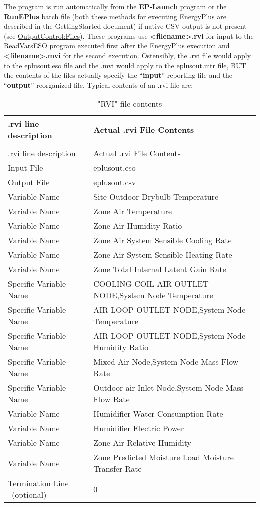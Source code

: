 The program is run automatically from the \textbf{EP-Launch} program or the \textbf{RunEPlus} batch file (both these methods for executing EnergyPlus are described in the GettingStarted document) if native CSV output is not present (see \hyperref[outputcontrolfiles]{OutputControl:Files}). These programs use \textbf{\textless{}filename\textgreater{}.rvi} for input to the ReadVarsESO program executed first after the EnergyPlus execution and \textbf{\textless{}filename\textgreater{}.mvi} for the second execution. Ostensibly, the .rvi file would apply to the eplusout.eso file and the .mvi would apply to the eplusout.mtr file, BUT the contents of the files actually specify the ``\textbf{input}'' reporting file and the ``\textbf{output}'' reorganized file. Typical contents of an .rvi file are:

\begin{longtable}[c]{p{2.1in}p{3.9in}}
\caption{"RVI" file contents \label{table:rvi-file-contents}} \tabularnewline
\toprule
.rvi line description & Actual .rvi File Contents \tabularnewline
\midrule
\endfirsthead

\caption[]{"RVI" file contents} \tabularnewline
\toprule
.rvi line description & Actual .rvi File Contents \tabularnewline
\midrule
\endhead

Input File & eplusout.eso \tabularnewline
Output File & eplusout.csv \tabularnewline
Variable Name & Site Outdoor Drybulb Temperature \tabularnewline
Variable Name & Zone Air Temperature \tabularnewline
Variable Name & Zone Air Humidity Ratio \tabularnewline
Variable Name & Zone Air System Sensible Cooling Rate \tabularnewline
Variable Name & Zone Air System Sensible Heating Rate \tabularnewline
Variable Name & Zone Total Internal Latent Gain Rate \tabularnewline
Specific Variable Name & COOLING COIL AIR OUTLET NODE,System Node Temperature \tabularnewline
Specific Variable Name & AIR LOOP OUTLET NODE,System Node Temperature \tabularnewline
Specific Variable Name & AIR LOOP OUTLET NODE,System Node Humidity Ratio \tabularnewline
Specific Variable Name & Mixed Air Node,System Node Mass Flow Rate \tabularnewline
Specific Variable Name & Outdoor air Inlet Node,System Node Mass Flow Rate \tabularnewline
Variable Name & Humidifier Water Consumption Rate \tabularnewline
Variable Name & Humidifier Electric Power \tabularnewline
Variable Name & Zone Air Relative Humidity \tabularnewline
Variable Name & Zone Predicted Moisture Load Moisture Transfer Rate \tabularnewline
Termination Line ~(optional) & 0 \tabularnewline
\bottomrule
\end{longtable}

